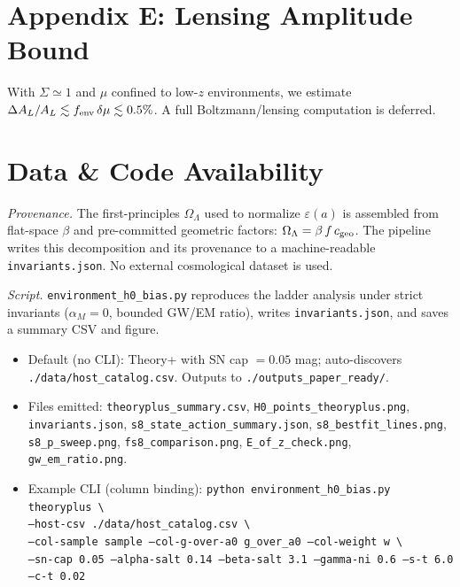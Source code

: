 \documentclass[aps,prd,onecolumn,notitlepage,superscriptaddress,nofootinbib]{revtex4-2}
\newcommand{\OL}{\Omega_{\Lambda}}
\newcommand{\alpham}{\alpha_M}
\newcommand{\eps}{\varepsilon}
\begin{document}
\section*{Appendix E: Lensing Amplitude Bound}
With \(\Sigma\simeq 1\) and \(\mu\) confined to low-\(z\) environments, we estimate \(\Delta A_L/A_L \lesssim f_{\rm env}\,\delta\mu \lesssim 0.5\%\). A full Boltzmann/lensing computation is deferred.

\section*{Data \& Code Availability}
\emph{Provenance.} The first-principles \(\OL\) used to normalize \(\eps(a)\) is assembled from flat-space \(\beta\) and pre-committed geometric factors: \(\OL=\beta\,f\,c_{\rm geo}\). The pipeline writes this decomposition and its provenance to a machine-readable \texttt{invariants.json}. No external cosmological dataset is used.

\emph{Script.} \texttt{environment\_h0\_bias.py} reproduces the ladder analysis under strict invariants (\(\alpham=0\), bounded GW/EM ratio), writes \texttt{invariants.json}, and saves a summary CSV and figure.
\begin{itemize}[leftmargin=*]
\item Default (no CLI): Theory+ with SN cap \(=0.05\) mag; auto-discovers \texttt{./data/host\_catalog.csv}. Outputs to \texttt{./outputs\_paper\_ready/}.
\item Files emitted: \texttt{theoryplus\_summary.csv}, \texttt{H0\_points\_theoryplus.png}, \texttt{invariants.json}, \texttt{s8\_state\_action\_summary.json}, \texttt{s8\_bestfit\_lines.png}, \texttt{s8\_p\_sweep.png}, \texttt{fs8\_comparison.png}, \texttt{E\_of\_z\_check.png}, \texttt{gw\_em\_ratio.png}.
\item Example CLI (column binding): \texttt{python environment\_h0\_bias.py theoryplus \textbackslash{}}\\
\hspace*{1.2em}\texttt{--host-csv ./data/host\_catalog.csv \textbackslash{}}\\
\hspace*{1.2em}\texttt{--col-sample sample --col-g-over-a0 g\_over\_a0 --col-weight w \textbackslash{}}\\
\hspace*{1.2em}\texttt{--sn-cap 0.05 --alpha-salt 0.14 --beta-salt 3.1 --gamma-ni 0.6 --s-t 6.0 --c-t 0.02}
\end{itemize}
\end{document}
